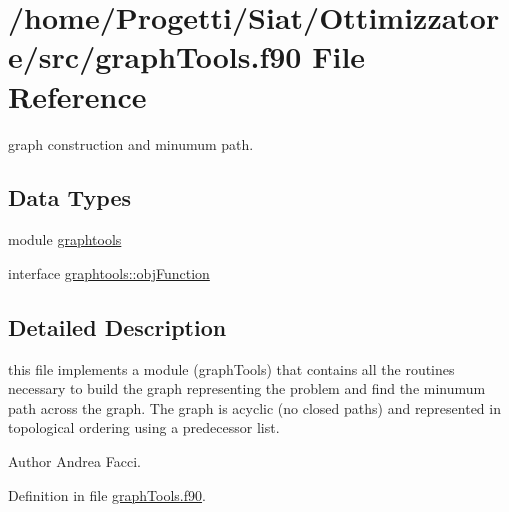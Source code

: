 \hypertarget{graph_tools_8f90}{\section{/home/\-Progetti/\-Siat/\-Ottimizzatore/src/graph\-Tools.f90 File Reference}
\label{graph_tools_8f90}
}


graph construction and minumum path.  


\subsection*{Data Types}
\begin{DoxyCompactItemize}
\item 
module \hyperlink{classgraphtools}{graphtools}
\item 
interface \hyperlink{interfacegraphtools_1_1obj_function}{graphtools\-::obj\-Function}
\end{DoxyCompactItemize}


\subsection{Detailed Description}
this file implements a module (graph\-Tools) that contains all the routines necessary to build the graph representing the problem and find the minumum path across the graph. The graph is acyclic (no closed paths) and represented in topological ordering using a predecessor list. \begin{DoxyAuthor}{Author}
Andrea Facci. 
\end{DoxyAuthor}


Definition in file \hyperlink{graph_tools_8f90_source}{graph\-Tools.\-f90}.

